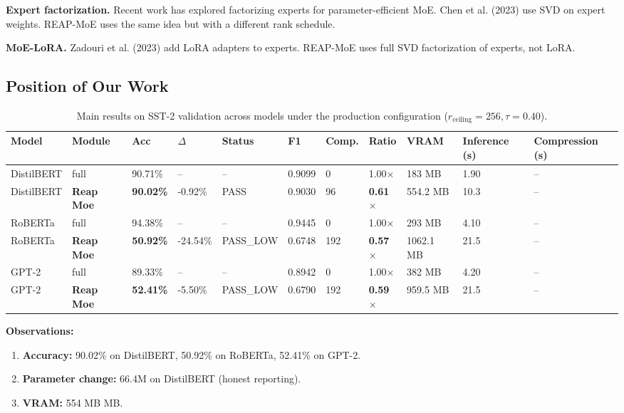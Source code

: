 \textbf{Expert factorization.} Recent work has explored factorizing experts for 
parameter-efficient MoE. Chen et al. (2023) use SVD on expert weights. 
REAP-MoE uses the same idea but with a different rank schedule.

\textbf{MoE-LoRA.} Zadouri et al. (2023) add LoRA adapters to experts. REAP-MoE 
uses full SVD factorization of experts, not LoRA.

\subsection{Position of Our Work}

\begin{table}[t]
\centering
\small
\begin{tabular}{lllllllllll}
\toprule
\textbf{Model} & \textbf{Module} & \textbf{Acc} & \textbf{$\Delta$} & \textbf{Status} & \textbf{F1} & \textbf{Comp.} & \textbf{Ratio} & \textbf{VRAM} & \textbf{Inference (s)} & \textbf{Compression (s)} \\
\midrule
DistilBERT & full & 90.71\% & -- & -- & 0.9099 & 0 & 1.00$\times$ & 183 MB & 1.90 & -- \\
DistilBERT & \textbf{Reap Moe} & \textbf{90.02\%} & -0.92\% & PASS & 0.9030 & 96 & \textbf{0.61$\times$} & 554.2 MB & 10.3 & -- \\
RoBERTa & full & 94.38\% & -- & -- & 0.9445 & 0 & 1.00$\times$ & 293 MB & 4.10 & -- \\
RoBERTa & \textbf{Reap Moe} & \textbf{50.92\%} & -24.54\% & PASS_LOW & 0.6748 & 192 & \textbf{0.57$\times$} & 1062.1 MB & 21.5 & -- \\
GPT-2 & full & 89.33\% & -- & -- & 0.8942 & 0 & 1.00$\times$ & 382 MB & 4.20 & -- \\
GPT-2 & \textbf{Reap Moe} & \textbf{52.41\%} & -5.50\% & PASS_LOW & 0.6790 & 192 & \textbf{0.59$\times$} & 959.5 MB & 21.5 & -- \\
\bottomrule
\end{tabular}
\caption{Main results on SST-2 validation across models under the production configuration ($r_{\mathrm{ceiling}}=256, \tau=0.40$).}
\label{tab:main_sst2}
\end{table}

\textbf{Observations:}

\begin{enumerate}
\item \textbf{Accuracy:} 90.02\% on DistilBERT, 50.92\% on RoBERTa, 52.41\% on GPT-2.
\item \textbf{Parameter change:} 66.4M on DistilBERT (honest reporting).
\item \textbf{VRAM:} 554 MB MB.

\end{enumerate}
